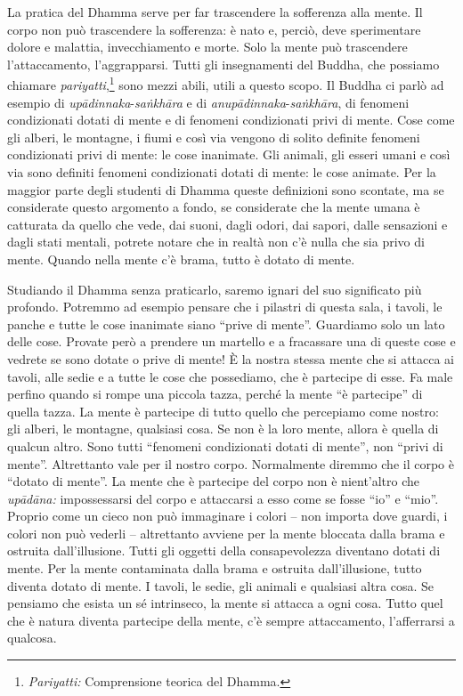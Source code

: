 La pratica del Dhamma serve per far trascendere la sofferenza alla
mente. Il corpo non può trascendere la sofferenza: è nato e, perciò,
deve sperimentare dolore e malattia, invecchiamento e morte. Solo la
mente può trascendere l'attaccamento, l'aggrapparsi. Tutti gli
insegnamenti del Buddha, che possiamo chiamare
\emph{pariyatti},\footnote{\emph{Pariyatti:} Comprensione teorica del Dhamma.}
sono mezzi abili, utili a questo scopo. Il Buddha ci
parlò ad esempio di \emph{upādinnaka}-\emph{saṅkhāra} e di
\emph{anupādinnaka}-\emph{saṅkhāra}, di fenomeni condizionati dotati di
mente e di fenomeni condizionati privi di mente. Cose come gli alberi,
le montagne, i fiumi e così via vengono di solito definite fenomeni
condizionati privi di mente: le cose inanimate. Gli animali, gli esseri
umani e così via sono definiti fenomeni condizionati dotati di mente: le
cose animate. Per la maggior parte degli studenti di Dhamma queste
definizioni sono scontate, ma se considerate questo argomento a fondo,
se considerate che la mente umana è catturata da quello che vede, dai
suoni, dagli odori, dai sapori, dalle sensazioni e dagli stati mentali,
potrete notare che in realtà non c'è nulla che sia privo di mente.
Quando nella mente c'è brama, tutto è dotato di mente.

Studiando il Dhamma senza praticarlo, saremo ignari del suo significato
più profondo. Potremmo ad esempio pensare che i pilastri di questa sala,
i tavoli, le panche e tutte le cose inanimate siano ``prive di mente''.
Guardiamo solo un lato delle cose. Provate però a prendere un martello e
a fracassare una di queste cose e vedrete se sono dotate o prive di
mente! È la nostra stessa mente che si attacca ai tavoli, alle sedie e a
tutte le cose che possediamo, che è partecipe di esse. Fa male perfino
quando si rompe una piccola tazza, perché la mente ``è partecipe'' di
quella tazza. La mente è partecipe di tutto quello che percepiamo come
nostro: gli alberi, le montagne, qualsiasi cosa. Se non è la loro mente,
allora è quella di qualcun altro. Sono tutti ``fenomeni condizionati
dotati di mente'', non ``privi di mente''. Altrettanto vale per il
nostro corpo. Normalmente diremmo che il corpo è ``dotato di mente''. La
mente che è partecipe del corpo non è nient'altro che \emph{upādāna:}
impossessarsi del corpo e attaccarsi a esso come se fosse ``io'' e
``mio''. Proprio come un cieco non può immaginare i colori -- non
importa dove guardi, i colori non può vederli -- altrettanto avviene per
la mente bloccata dalla brama e ostruita dall'illusione. Tutti gli
oggetti della consapevolezza diventano dotati di mente. Per la mente
contaminata dalla brama e ostruita dall'illusione, tutto diventa dotato
di mente. I tavoli, le sedie, gli animali e qualsiasi altra cosa. Se
pensiamo che esista un sé intrinseco, la mente si attacca a ogni cosa.
Tutto quel che è natura diventa partecipe della mente, c'è sempre
attaccamento, l'afferrarsi a qualcosa.

